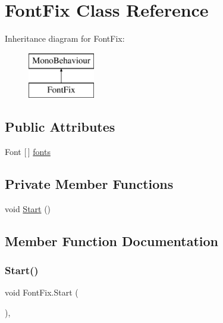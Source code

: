 \hypertarget{class_font_fix}{}\section{Font\+Fix Class Reference}
\label{class_font_fix}
Inheritance diagram for Font\+Fix\+:\begin{figure}[H]
\begin{center}
\leavevmode
\includegraphics[height=2.000000cm]{class_font_fix}
\end{center}
\end{figure}
\subsection*{Public Attributes}
\begin{DoxyCompactItemize}
\item 
Font \mbox{[}$\,$\mbox{]} \mbox{\hyperlink{class_font_fix_a946dd8dae881f5d750fbcc49760b1641}{fonts}}
\end{DoxyCompactItemize}
\subsection*{Private Member Functions}
\begin{DoxyCompactItemize}
\item 
void \mbox{\hyperlink{class_font_fix_ac26465b4541709e7e646abd76259db26}{Start}} ()
\end{DoxyCompactItemize}


\subsection{Member Function Documentation}
\mbox{\label{class_font_fix_ac26465b4541709e7e646abd76259db26}} 
\subsubsection{\texorpdfstring{Start()}{Start()}}
{\footnotesize\ttfamily void Font\+Fix.\+Start (\begin{DoxyParamCaption}{ }\end{DoxyParamCaption})\hspace{0.3cm}{\ttfamily [inline]}, {\ttfamily [private]}}

